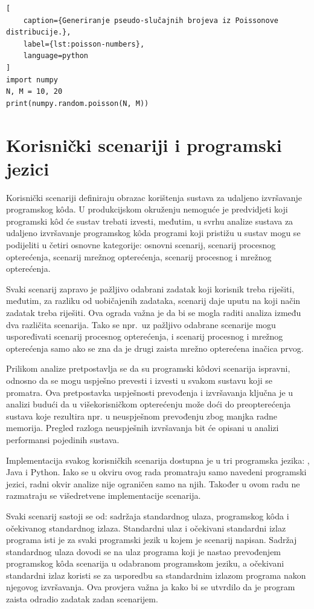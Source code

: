 \documentclass[times, utf8, diplomski]{fer}
\begin{document}
\begin{lstlisting}[
    caption={Generiranje pseudo-slučajnih brojeva iz Poissonove distribucije.},
    label={lst:poisson-numbers},
    language=python
]
import numpy
N, M = 10, 20
print(numpy.random.poisson(N, M))
\end{lstlisting}

\section{Korisnički scenariji i programski jezici}
Korisnički scenariji definiraju obrazac korištenja sustava za udaljeno izvršavanje programskog kôda. U produkcijskom okruženju nemoguće je predvidjeti koji programski kôd će sustav trebati izvesti, međutim, u svrhu analize sustava za udaljeno izvršavanje programskog kôda programi koji pristižu u sustav mogu se podijeliti u četiri osnovne kategorije: osnovni scenarij, scenarij procesnog opterećenja, scenarij mrežnog opterećenja, scenarij procesnog i mrežnog opterećenja.

Svaki scenarij zapravo je pažljivo odabrani zadatak koji korisnik treba riješiti, međutim, za razliku od uobičajenih zadataka, scenarij daje uputu na koji način zadatak treba riješiti. Ova ograda važna je da bi se mogla raditi analiza između dva različita scenarija. Tako se npr.\ uz pažljivo odabrane scenarije mogu uspoređivati scenarij procesnog opterećenja, i scenarij procesnog i mrežnog opterećenja samo ako se zna da je drugi zaista mrežno opterećena inačica prvog.

Prilikom analize pretpostavlja se da su programski kôdovi scenarija ispravni, odnosno da se mogu uspješno prevesti i izvesti u svakom sustavu koji se promatra. Ova pretpostavka uspješnosti prevođenja i izvršavanja ključna je u analizi budući da u višekorisničkom opterećenju može doći do preopterećenja sustava koje rezultira npr. u neuspješnom prevođenju zbog manjka radne memorija. Pregled razloga neuspješnih izvršavanja bit će opisani u analizi performansi pojedinih sustava.

Implementacija svakog korisničkih scenarija dostupna je u tri programska jezika: , Java i Python. Iako se u okviru ovog rada promatraju samo navedeni programski jezici, radni okvir analize nije ograničen samo na njih. Također u ovom radu ne razmatraju se višedretvene implementacije scenarija.

Svaki scenarij sastoji se od: sadržaja standardnog ulaza, programskog kôda i očekivanog standardnog izlaza. Standardni ulaz i očekivani standardni izlaz programa isti je za svaki programski jezik u kojem je scenarij napisan. Sadržaj standardnog ulaza dovodi se na ulaz programa koji je nastao prevođenjem programskog kôda scenarija u odabranom programskom jeziku, a očekivani standardni izlaz koristi se za usporedbu sa standardnim izlazom programa nakon njegovog izvršavanja. Ova provjera važna ja kako bi se utvrdilo da je program zaista odradio zadatak zadan scenarijem.
\end{document}
